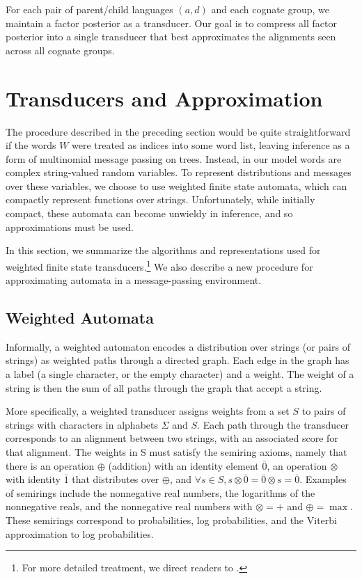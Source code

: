 \documentclass[11pt,a4paper]{article}
\begin{document}
For each pair of parent/child languages $(a,d)$ and each
cognate group, we maintain a factor posterior as a transducer.  Our
goal is to compress all factor posterior into a single transducer
that best approximates the alignments seen across all cognate groups.


\section{Transducers and Approximation}

The procedure described in the preceding section would be quite
straightforward if the words $W$ were treated as indices into some
word list, leaving inference as a form of multinomial message passing
on trees. Instead, in our model words are complex string-valued
random variables. To represent distributions and messages over
these variables, we choose to use weighted finite state automata,
which can compactly represent functions over strings. Unfortunately,
while initially compact, these automata can become unwieldy in
inference, and so approximations must be used.

In this section, we summarize the algorithms and representations
used for weighted finite state transducers.\footnote{For more
detailed treatment, we direct readers to .}
We also describe a new procedure for approximating automata in a
message-passing environment.

\subsection{Weighted Automata}

Informally, a weighted automaton encodes a distribution over strings
(or pairs of strings) as weighted paths through a directed graph.
Each edge in the graph has a label (a single character, or the empty
character) and a weight. The weight of a string is then the sum
of all paths through the graph that accept a string.

More specifically, a weighted transducer assigns weights from a set
$S$ to pairs of strings with characters in alphabets $\Sigma$ and
$S$. Each path through the transducer corresponds to an alignment
between two strings, with an associated score for that alignment.
The weights in S must satisfy the semiring axioms, namely that there
is an operation $\oplus$ (addition) with an identity element $\bar
0$, an operation $\otimes$ with identity $\bar 1$ that distributes
over $\oplus$, and $\forall s\in S, s\otimes \bar 0 = \bar 0 \otimes
s = \bar 0$. Examples of semirings include the nonnegative real
numbers, the logarithms of the nonnegative reals, and the nonnegative
real numbers with $\otimes = +$ and $\oplus = \max$. These semirings
correspond to probabilities, log probabilities, and the Viterbi
approximation to log probabilities.
\end{document}
